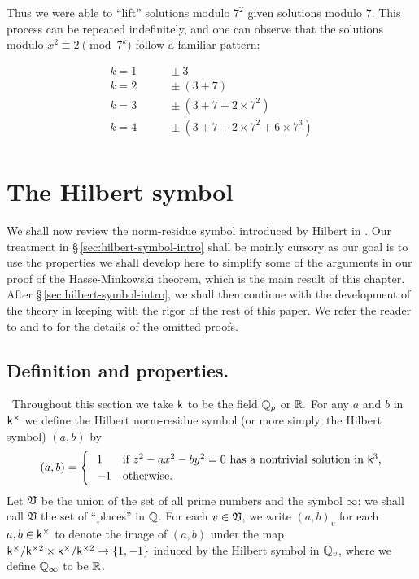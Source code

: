 Thus we were able to ``lift'' solutions modulo \(7^2\) given solutions modulo
\(7\). This process can be repeated indefinitely, and one can observe that the
solutions modulo \(x^2 \equiv 2 \pmod{7^k}\) follow a familiar pattern:

\begin{align*}
    k = 1 & \qquad \pm 3 \\
    k = 2 & \qquad \pm (3 + 7) \\
    k = 3 & \qquad \pm (3 + 7 + 2 \times 7^2) \\
    k = 4 & \qquad \pm (3 + 7 + 2 \times 7^2 + 6 \times 7^3) \\
\end{align*}

\section{The Hilbert symbol}\label{sec:hilbert-symbol}

We shall now review the norm-residue symbol introduced by Hilbert in
\cite[pp.~286--287]{hilbert1932theorie}. Our treatment in
\S\,\ref{sec:hilbert-symbol-intro} shall be mainly cursory as our goal is to use
the properties we shall develop here to simplify some of the arguments in our
proof of the Hasse-Minkowski theorem, which is the main result of this chapter.
After \S\,\ref{sec:hilbert-symbol-intro}, we shall then continue with the
development of the theory in keeping with the rigor of the rest of this paper.
We refer the reader to \cite{serre2012course} and to
\cite{sutherland2013introduction10} for the details of the omitted proofs.

\subsection{Definition and properties.}~Throughout this section we take
\(\mathsf{k}\) to be the field \(\mathbb{Q}_p\) or \(\mathbb{R}.\) For any \(a\) and
\(b\) in \(\mathsf{k}^{\times}\) we define the Hilbert norm-residue symbol (or more simply,
the Hilbert symbol) \((a, b)\) by
\[
    (a, b) = \begin{cases}
        \ \ 1 & \text{if } z^2 - ax^2 - by^2 = 0 \text{ has a nontrivial solution in } \mathsf{k}^3, \\
        \ \ -1 & \text{otherwise}.
    \end{cases}
\]
\label{sec:hilbert-symbol-intro}
Let \(\mathfrak{V}\) be the union of the set of all prime numbers and the symbol
\(\infty\); we shall call \(\mathfrak{V}\) the set of ``places'' in
\(\mathbb{Q}\). For each \(v \in \mathfrak{V}\), we write \((a, b)_v\) for  each \(a,
b \in \mathsf{k}^{\times}\) to denote the image of \((a, b)\) under the map \(\mathsf{k}^{\times}/\mathsf{k}^{\times2}
\times \mathsf{k}^{\times}/\mathsf{k}^{\times2} \to \{1, -1\}\) induced by the Hilbert symbol in
\(\mathbb{Q}_v\), where we define \(\mathbb{Q}_{\infty}\) to be \(\mathbb{R}\).

